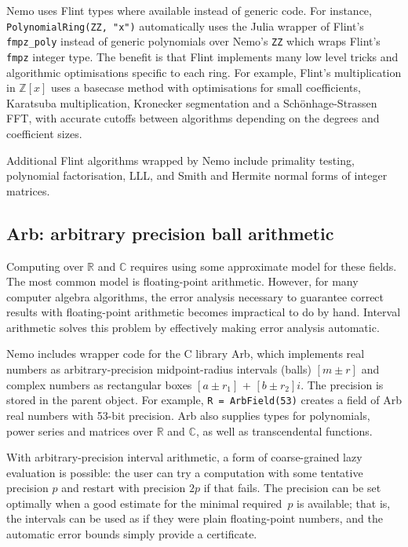 \documentclass{sig-alternate-05-2015}
\begin{document}
Nemo uses Flint types where available instead of generic code.
For instance, \texttt{PolynomialRing(ZZ, "x")} automatically uses
the Julia wrapper of Flint's \texttt{fmpz\_poly} instead of generic
polynomials over Nemo's \texttt{ZZ} which wraps Flint's \texttt{fmpz}
integer type.
The benefit is that
Flint implements many low level tricks and algorithmic optimisations
specific to each ring. For example, Flint's multiplication in $\mathbb{Z}[x]$
uses a basecase method with optimisations for small coefficients,
Karatsuba multiplication, Kronecker segmentation and
a Sch\"{o}nhage-Strassen FFT, with accurate cutoffs
between algorithms depending on the degrees and coefficient sizes.

Additional Flint algorithms wrapped by Nemo include
primality testing, polynomial factorisation, LLL, and Smith and Hermite
normal forms of integer matrices.

\subsection{Arb: arbitrary precision ball arithmetic}

Computing over $\mathbb{R}$ and $\mathbb{C}$ requires
using some approximate model for these fields.
The most common model is floating-point arithmetic.
However, for many computer algebra algorithms, the error analysis
necessary to guarantee correct results with floating-point arithmetic
becomes impractical to do by hand.
Interval arithmetic solves this problem by effectively making
error analysis automatic.

Nemo includes wrapper code for the C library Arb, which implements real numbers as
arbitrary-precision midpoint-radius intervals (balls) $[m \pm r]$
and complex numbers as rectangular boxes $[a \pm r_1]$ + $[b \pm r_2] i$.
The precision is stored in the parent object.
For example, \texttt{R = ArbField(53)}
creates a field of Arb real numbers with 53-bit precision.
Arb also supplies types for polynomials, power series and matrices
over $\mathbb{R}$ and $\mathbb{C}$, as well as transcendental functions.

With arbitrary-precision interval arithmetic, a form of
coarse-grained lazy evaluation is possible: the user can
try a computation with some tentative precision $p$ and restart
with precision $2p$ if that fails. The precision can be set
optimally when a good estimate for the minimal
required~$p$ is available; that is, the intervals
can be used as if they were plain floating-point numbers, and the automatic
error bounds simply provide a certificate.
\end{document}
